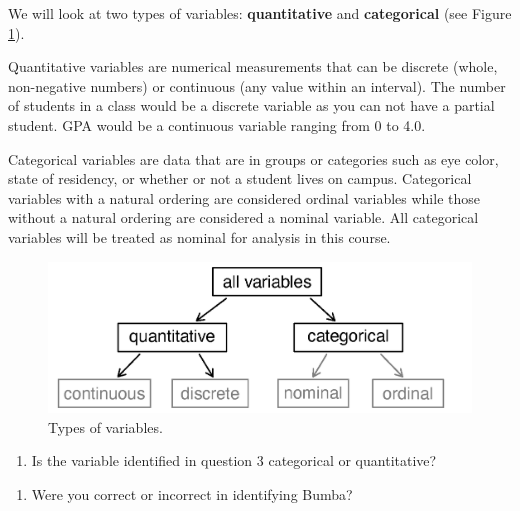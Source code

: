 \documentclass[
]{report}
\providecommand{\tightlist}{%
  \setlength{\itemsep}{0pt}\setlength{\parskip}{0pt}}
\begin{document}
\vspace{.8in}

We will look at two types of variables: \textbf{quantitative} and \textbf{categorical} (see Figure \ref{fig:types-of-variables}).

Quantitative variables are numerical measurements that can be discrete (whole, non-negative numbers) or continuous (any value within an interval). The number of students in a class would be a discrete variable as you can not have a partial student. GPA would be a continuous variable ranging from 0 to 4.0.

Categorical variables are data that are in groups or categories such as eye color, state of residency, or whether or not a student lives on campus. Categorical variables with a natural ordering are considered ordinal variables while those without a natural ordering are considered a nominal variable. All categorical variables will be treated as nominal for analysis in this course.

\begin{figure}

{\centering \includegraphics[width=0.6\linewidth]{images/variables} 

}

\caption{Types of variables.}\label{fig:types-of-variables}
\end{figure}

\begin{enumerate}
\def\labelenumi{\arabic{enumi}.}
\setcounter{enumi}{3}
\tightlist
\item
  Is the variable identified in question 3 categorical or quantitative?
\end{enumerate}

\vspace{0.3in}

\begin{enumerate}
\def\labelenumi{\arabic{enumi}.}
\setcounter{enumi}{4}
\tightlist
\item
  Were you correct or incorrect in identifying Bumba?
\end{enumerate}

\vspace{0.3in}
\end{document}
